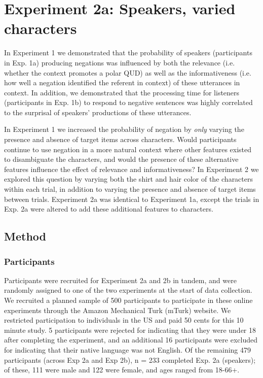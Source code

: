 \documentclass[man, floatsintext, noapacite]{apa6}
\begin{document}
\section{Experiment 2a: Speakers, varied characters}

In Experiment 1 we demonstrated that the probability of speakers (participants in Exp. 1a) producing negations was influenced by both the relevance (i.e. whether the context promotes a polar QUD) as well as the informativeness (i.e. how well a negation identified the referent in context) of these utterances in context. In addition, we demonstrated that the processing time for listeners (participants in Exp. 1b) to respond to negative sentences was highly correlated to the surprisal of speakers' productions of these utterances. 

In Experiment 1 we increased the probability of negation by \textit{only} varying the presence and absence of target items across characters. Would participants continue to use negation in a more natural context where other features existed to disambiguate the characters, and would the presence of these alternative features influence the effect of relevance and informativeness? In Experiment 2 we explored this question by varying both the shirt and hair color of the characters within each trial, in addition to varying the presence and absence of target items between trials. Experiment 2a was identical to Experiment 1a, except the trials in Exp. 2a were altered to add these additional features to characters. 

\subsection{Method}

\subsubsection{Participants} 

Participants were recruited for Experiment 2a and 2b in tandem, and were randomly assigned to one of the two experiments at the start of data collection. We recruited a planned sample of 500 participants to participate in these online experiments through the Amazon Mechanical Turk (mTurk) website. We restricted participation to individuals in the US and paid 50 cents for this 10 minute study. 5 participants were rejected for indicating that they were under 18 after completing the experiment, and an additional 16 participants were excluded for indicating that their native language was not English. Of the remaining 479 participants (across Exp 2a and Exp 2b), n = 233 completed Exp. 2a (speakers); of these, 111 were male and 122 were female, and ages ranged from 18-66+. 
\end{document}
